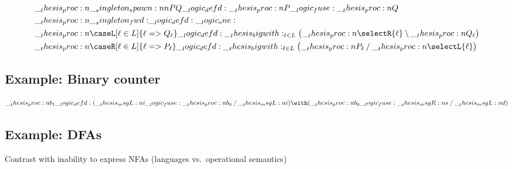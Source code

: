 \begin{equation*}
  \begin{lgathered}
    \proc{\spawn{P}{Q}} \defd \proc{P} \fuse \proc{Q} \\
    \proc{\fwd} \defd \one \\
    \proc{\caseL[\ell \in L]{\ell => Q_{\ell}}} \defd \bigwith_{\ell \in L}\bigl(\proc{\selectR{\ell}} \limp \proc{Q_{\ell}}\bigr) \\
    \proc{\caseR[\ell \in L]{\ell => P_{\ell}}} \defd \bigwith_{\ell \in L}\bigl(\proc{P_{\ell}} \pmir \proc{\selectL{\ell}}\bigr)
  \end{lgathered}
\end{equation*}

\subsection{Example: Binary counter}

\begin{equation*}
  \proc{b_1} \defd (\msgL{i} \fuse \proc{b_0} \pmir \msgL{i}) \with (\proc{b_0} \fuse \msgR{s} \pmir \msgL{d})
\end{equation*}

\subsection{Example: \Aclp*{DFA}}

Contrast with inability to express \acp{NFA} (languages vs.\ operational semantics)

